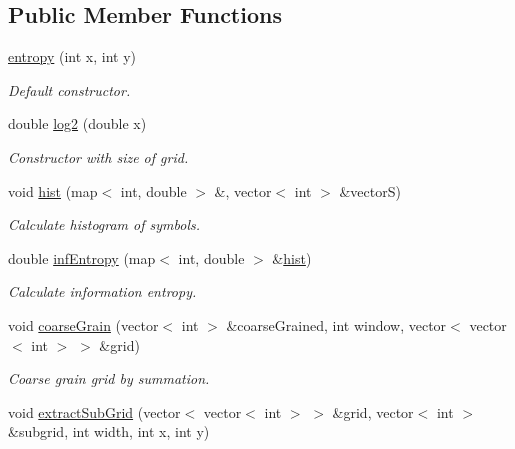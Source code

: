 \subsection*{Public Member Functions}
\begin{DoxyCompactItemize}
\item 
\mbox{\label{classentropy_a669cc325fe3153318f31dd8008a28ca6}} 
\hyperlink{classentropy_a669cc325fe3153318f31dd8008a28ca6}{entropy} (int x, int y)
\begin{DoxyCompactList}\small\item\em Default constructor. \end{DoxyCompactList}\item 
\mbox{\label{classentropy_adeae61cb4c6a7f89f80878adcd476f43}} 
double \hyperlink{classentropy_adeae61cb4c6a7f89f80878adcd476f43}{log2} (double x)
\begin{DoxyCompactList}\small\item\em Constructor with size of grid. \end{DoxyCompactList}\item 
void \hyperlink{classentropy_a71fa5242cb3b25a8dc61e4fdd05ecf65}{hist} (map$<$ int, double $>$ \&, vector$<$ int $>$ \&vectorS)
\begin{DoxyCompactList}\small\item\em Calculate histogram of symbols. \end{DoxyCompactList}\item 
double \hyperlink{classentropy_a11cea34215fb0b30d0c5b1f97a4b2031}{inf\+Entropy} (map$<$ int, double $>$ \&\hyperlink{classentropy_a71fa5242cb3b25a8dc61e4fdd05ecf65}{hist})
\begin{DoxyCompactList}\small\item\em Calculate information entropy. \end{DoxyCompactList}\item 
void \hyperlink{classentropy_a1a52c035a25b949d699b8e17ffad8559}{coarse\+Grain} (vector$<$ int $>$ \&coarse\+Grained, int window, vector$<$ vector$<$ int $>$ $>$ \&grid)
\begin{DoxyCompactList}\small\item\em Coarse grain grid by summation. \end{DoxyCompactList}\item 
void \hyperlink{classentropy_a4dce3a1c33340db5371c2b5d4b64a62e}{extract\+Sub\+Grid} (vector$<$ vector$<$ int $>$ $>$ \&grid, vector$<$ int $>$ \&subgrid, int width, int x, int y)

\end{DoxyCompactItemize}
